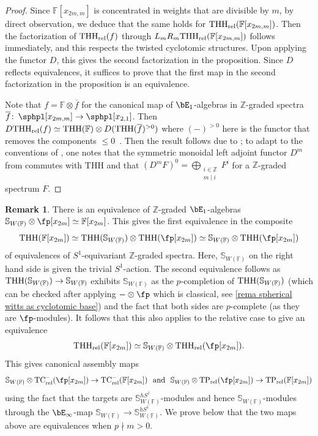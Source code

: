 \documentclass[english,10pt]{amsart}
\newcommand{\sph}{\mathbb{S}}
\newcommand{\rel}{\textup{rel}}
\newcommand{\field}{\mathbb{F}}
\theoremstyle{definition}
\newtheorem{rema}{Remark}[section]
\numberwithin{equation}{section}
\DeclareMathOperator{\thh}{\ensuremath{\textup{THH}}}
\newcommand{\rntc}{\mathrm{TC}_{\rel}^{-}}
\newcommand{\rtp}{\mathrm{TP}_{\rel}}
\newcommand{\rthh}{\mathrm{THH}_{\rel}}
\newcommand{\z}{\mathbb{Z}}
\def\co{\colon\thinspace}
\begin{document}
\begin{proof}
Since $\field[x_{2m,m}]$ is concentrated in weights that are divisible by $m$, by direct observation, we deduce that the same holds for $\rthh(\field[x_{2m,m}])$. Then the factorization of $\rthh(f)$ through $L_mR_m\rthh(\field[x_{2m,m}])$ follows immediately, 
and this respects the twisted cyclotomic structures. Upon applying the functor $D$, this gives the second factorization in the proposition. Since $D$ reflects equivalences, it suffices to prove that the first map in the second factorization in the proposition is an equivalence.  

Note that $f = \field \otimes \overline{f}$ for the canonical map of $\bE_1$-algebras in $\z$-graded spectra $\overline{f}\co\sphpl[x_{2m,m}] \to \sphpl[x_{2,1}]$. Then   $D\rthh(f) \simeq \thh(\field)\otimes D(\thh(\overline{f})^{> 0})$ where $(-)^{>0}$ here is the functor that removes the components $\le 0$~\cite[Lemma ~B.0.6]{hahn2020redshift}. 
Then the result follows due to  \cite[Proposition 4.17]{ausoni2022adjroot}; to adapt to the conventions of \cite[Proposition 4.17]{ausoni2022adjroot}, one notes that the  symmetric monoidal left adjoint functor $D^m$ from \cite[Section 2.2]{ausoni2022adjroot} commutes with THH and that  $(D^m F)^0 = \bigoplus_{ \substack{i \in \z \\ m \mid i}} F^i $ for a $\z$-graded spectrum $F$.
\end{proof}

\begin{rema}\label{rema passage to witt vector coefficients for formal}
There is an equivalence of $\z$-graded $\bE_1$-algebras $\sph_{W(\field)} \otimes \fp[x_{2m}] \simeq \field[x_{2m}]$. This gives the first equivalence in the composite 
\[\thh(\field[x_{2m}]) \simeq \thh(\sph_{W(\field)}) \otimes \thh(\fp[x_{2m}]) \simeq \sph_{W(\field)} \otimes \thh(\fp[x_{2m}])\]
of equivalences of $S^1$-equivariant $\z$-graded spectra. 
Here, $\sph_{W(\field)}$ on the right hand side is given the trivial $S^1$-action. The second equivalence follows as $\thh(\sph_{W(\field)}) \to \sph_{W(\field)}$ exhibits $ \sph_{W(\field)}$ as the $p$-completion of $\thh(\sph_{W(\field)})$ (which can be checked after applying $-\otimes \fp$ which is classical, see  \autoref{rema spherical witts as cyclotomic base}) and the fact that both sides are $p$-complete (as they are $\fp$-modules). It follows that this also applies to the relative case to give an equivalence 
\begin{equation}\label{eq for relthh taking witt out in the formal dga}
\rthh(\field[x_{2m}]) \simeq \sph_{W(\field)} \otimes \rthh(\fp[x_{2m}]).
\end{equation}
This gives canonical assembly maps 
\[\sph_{W(\field)} \otimes \rntc(\fp[x_{2m}]) \to \rntc(\field[x_{2m}]) \textup{\ \ and \ } \sph_{W(\field)} \otimes \rtp(\fp[x_{2m}]) \to \rtp(\field[x_{2m}])\]
using the fact that the targets are $\sph_{W(\field)}^{hS^1}$-modules and hence  $\sph_{W(\field)}$-modules through the $\bE_\infty$-map $\sph_{W(\field)} \to \sph_{W(\field)}^{hS^1}$. We prove below that the two maps above are  equivalences when $p\nmid m>0$. 
\end{rema} 
\end{document}
